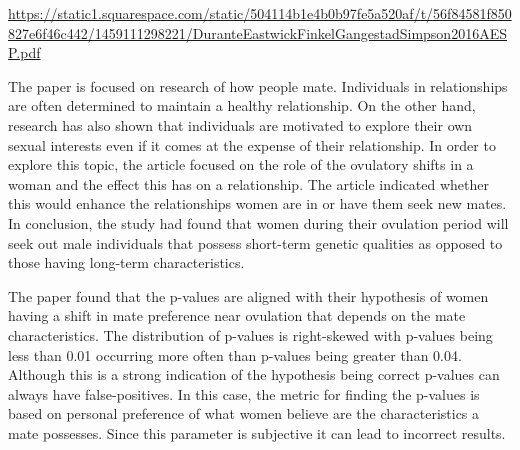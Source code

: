 \documentclass[./ProjectReport.tex]{subfiles}
\begin{document}
\maketitle

\begin{center}
\par
\href{https://static1.squarespace.com/static/504114b1e4b0b97fe5a520af/t/56f84581f850827e6f46c442/1459111298221/DuranteEastwickFinkelGangestadSimpson2016AESP.pdf}{https://static1.squarespace.com/static/504114b1e4b0b97fe5a520af/t/56f84581f850827e6f46c442/1459111298221/DuranteEastwickFinkelGangestadSimpson2016AESP.pdf}
\end{center}


\setlength{\parindent}{10ex}

The paper is focused on research of how people mate. Individuals in relationships are often determined to maintain a healthy relationship. On the other hand, research has also shown that individuals are motivated to explore their own sexual interests even if it comes at the expense of their relationship. In order to explore this topic, the article focused on the role of the ovulatory shifts in a woman and the effect this has on a relationship. The article indicated whether this would enhance the relationships women are in or  have them seek new mates. In conclusion, the study had found that women during their ovulation period will seek out male individuals that possess short-term genetic qualities as opposed to those having long-term characteristics.

\par
The paper found that the p-values are aligned with their hypothesis of women having a shift in mate preference near ovulation that depends on the mate characteristics. The distribution of p-values is right-skewed with p-values being less than 0.01 occurring more often than p-values being greater than 0.04. Although this is a strong indication of the hypothesis being correct p-values can always have false-positives. In this case, the metric for finding the p-values is based on personal preference of what women believe are the characteristics a mate possesses. Since this parameter is subjective it can lead to incorrect results.
\end{document}
